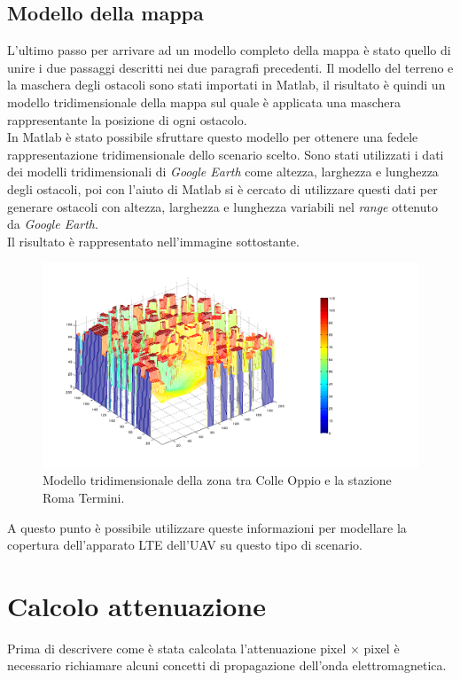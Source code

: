 \begin{itemize}
\subsection{Modello della mappa}
L'ultimo passo per arrivare ad un modello completo della mappa è stato quello di unire i due passaggi descritti nei due paragrafi
precedenti.
Il modello del terreno e la maschera degli ostacoli sono stati importati in Matlab, il risultato è quindi un modello tridimensionale
della mappa sul quale è applicata una maschera rappresentante la posizione di ogni ostacolo. \\
In Matlab è stato possibile sfruttare questo modello per ottenere una fedele rappresentazione tridimensionale dello scenario scelto. 
Sono stati utilizzati i dati dei modelli tridimensionali di \emph{Google Earth} come altezza, larghezza e lunghezza degli ostacoli, poi 
con l'aiuto di Matlab si è cercato di utilizzare questi dati per generare ostacoli con altezza, larghezza e lunghezza variabili nel
\emph{range} ottenuto da \emph{Google Earth}. \\
Il risultato è rappresentato nell'immagine sottostante. \\
\begin{figure}[!h]
\centering
\caption{Modello tridimensionale della zona tra Colle Oppio e la stazione Roma Termini.}
\label{img:modello}
\includegraphics[scale=0.4]{Immagini/colleoppio}
\end{figure}
A questo punto è possibile utilizzare queste informazioni per modellare la copertura dell'apparato \ac{LTE} dell'\ac{UAV} su questo tipo 
di scenario.
\end{itemize}
\newpage
\section{Calcolo attenuazione}
Prima di descrivere come è stata calcolata l'attenuazione pixel $\times$ pixel è necessario richiamare alcuni concetti di propagazione
dell'onda elettromagnetica.


